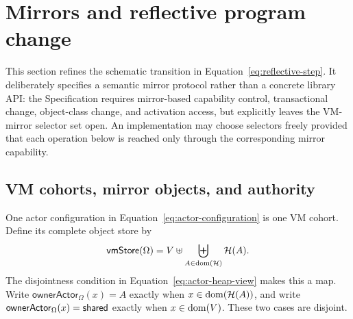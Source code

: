 \section{Mirrors and reflective program change}
\label{sec:reflection}

This section refines the schematic transition in
Equation~\eqref{eq:reflective-step}.  It deliberately specifies a semantic
mirror protocol rather than a concrete library API: the Specification requires
mirror-based capability control, transactional change, object-class change,
and activation access, but explicitly leaves the VM-mirror selector set open.
An implementation may choose selectors freely provided that each operation
below is reached only through the corresponding mirror capability.

\subsection{VM cohorts, mirror objects, and authority}

One actor configuration in Equation~\eqref{eq:actor-configuration} is one VM
cohort.  Define its complete object store by
\begin{equation}\label{eq:vm-object-store}
 \mathsf{vmStore}(\Omega)=
 V\uplus\biguplus_{A\in\mathop{\mathrm{dom}}(\mathcal H)}\mathcal H(A).
\end{equation}
The disjointness condition in Equation~\eqref{eq:actor-heap-view} makes this a
map.  Write $\mathsf{ownerActor}_{\Omega}(x)=A$ exactly when
$x\in\mathop{\mathrm{dom}}(\mathcal H(A))$, and write
$\mathsf{ownerActor}_{\Omega}(x)=\mathsf{shared}$ exactly when $x\in\mathop{\mathrm{dom}}(V)$.
These two cases are disjoint.

